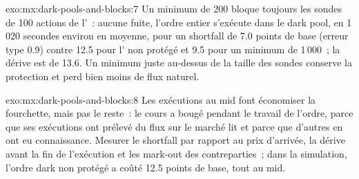 \begin{solution}{exo:mx:dark-pools-and-blocks:7}
Un minimum de 200 bloque toujours les sondes de 100 actions de l'~: aucune fuite, l'ordre entier s'exécute dans le dark pool, en 1\,020 secondes environ en moyenne, pour un
shortfall de 7.0 points de base (erreur type 0.9) contre 12.5 pour l' non protégé et 9.5 pour un minimum de 1\,000~; la dérive est de 13.6. Un minimum juste
au-dessus de la taille des sondes conserve la protection et perd bien moins de flux naturel.
\end{solution}

\begin{solution}{exo:mx:dark-pools-and-blocks:8}
Les exécutions au mid font économiser la fourchette, mais pas le reste~: le cours a bougé pendant le travail de l'ordre, parce que ses exécutions ont prélevé du flux sur le marché lit et
parce que d'autres en ont eu connaissance. Mesurer le shortfall par rapport au prix d'arrivée, la dérive avant la fin de l'exécution et les mark-out des contreparties~; dans la
simulation, l'ordre dark non protégé a coûté 12.5 points de base, tout au mid.
\end{solution}

